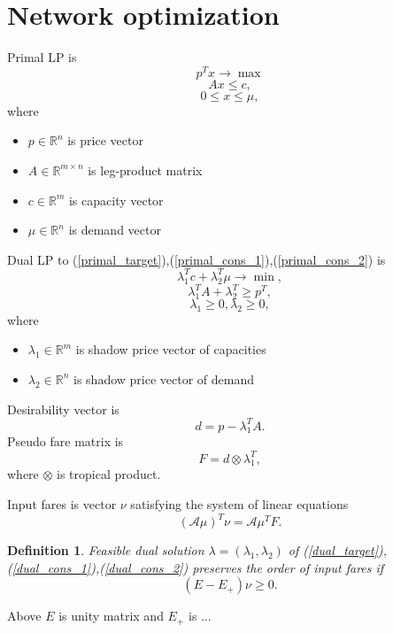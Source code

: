 \documentclass[a4paper,oneside]{article}
\newtheorem{defi}{Definition}
\begin{document}
\section{Network optimization}
Primal LP is
\begin{equation}
p^T x \longrightarrow \max
\label{primal_target}
\end{equation}
\begin{equation}
Ax \leq c,
\label{primal_cons_1}
\end{equation}
\begin{equation}
0 \leq x \leq \mu,
\label{primal_cons_2}
\end{equation}
where
\begin{itemize}
  \item $p\in \mathbb{R}^n$ is price vector
  \item $A\in \mathbb{R}^{m\times n}$ is leg-product matrix
  \item $c\in \mathbb{R}^m$ is capacity vector 
  \item $\mu\in \mathbb{R}^n$ is demand vector
\end{itemize}
Dual LP to (\ref{primal_target}),(\ref{primal_cons_1}),(\ref{primal_cons_2}) is 
\begin{equation}
\lambda_1^T c + \lambda_2^T \mu \longrightarrow \min,
\label{dual_target}
\end{equation}
\begin{equation}
\lambda_1^T A + \lambda_2^T \geq p^T,
\label{dual_cons_1}
\end{equation}
\begin{equation}
\lambda_1 \geq 0, \lambda_2 \geq 0,
\label{dual_cons_2}
\end{equation}
where
\begin{itemize}
  \item $\lambda_1\in \mathbb{R}^m$ is shadow price vector of capacities
  \item $\lambda_2\in \mathbb{R}^n$ is shadow price vector of demand
\end{itemize} 

Desirability vector is
$$
d = p - \lambda_1^T A.
$$
Pseudo fare matrix is
$$
F = d\otimes \lambda_1^T,
$$
where $\otimes$ is tropical product.

\noindent
Input fares is vector $\nu$ satisfying the system of linear equations
$$
(\mathcal{A}\mu)^T \nu = \mathcal{A} \mu^T F.
$$
\begin{defi}
Feasible dual solution $\lambda = (\lambda_1,\lambda_2)$ of (\ref{dual_target}),(\ref{dual_cons_1}),(\ref{dual_cons_2})
preserves the order of input fares if
$$
(E - E_+) \nu \geq 0.
$$
\end{defi}
Above $E$ is unity matrix and $E_+$ is ...
\end{document}
